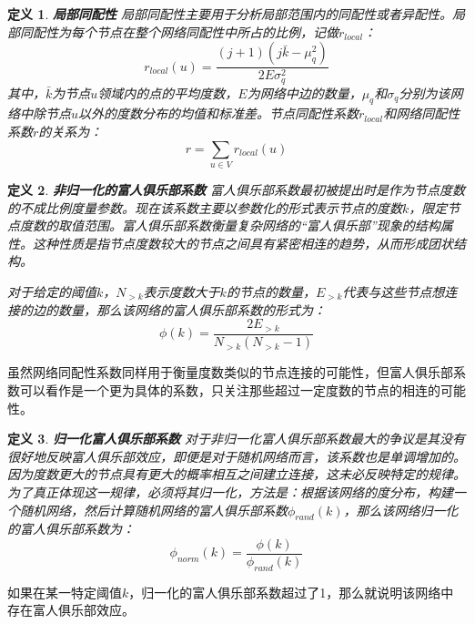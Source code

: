\documentclass{ctexart}
\newtheorem{Definition}{\hspace{2em}定义}[section]
\begin{document}
                \begin{Definition}
                    \textbf{局部同配性} 局部同配性主要用于分析局部范围内的同配性或者异配性。局部同配性为每个节点在整个网络同配性中所占的比例，记做$r_{local}$：
                    \begin{equation}
                        r_{local}(u) = \frac{(j + 1)(j\bar{k}-\mu_q^2)}{2 E \sigma_q^2}
                    \end{equation}
                    其中，$\bar{k}$为节点$u$领域内的点的平均度数，$E$为网络中边的数量，$\mu_q$和$\sigma_q$分别为该网络中除节点$u$以外的度数分布的均值和标准差。节点同配性系数$r_{local}$和网络同配性系数$r$的关系为：
                    \begin{equation}
                        r = \sum_{u\in V} r_{local}(u)
                    \end{equation}
                \end{Definition}
                \begin{Definition}
                    \textbf{非归一化的富人俱乐部系数} 富人俱乐部系数最初被提出时是作为节点度数的不成比例度量参数。现在该系数主要以参数化的形式表示节点的度数$k$，限定节点度数的取值范围。富人俱乐部系数衡量复杂网络的“富人俱乐部”现象的结构属性。这种性质是指节点度数较大的节点之间具有紧密相连的趋势，从而形成团状结构。

                    对于给定的阈值$k$，$N_{>k}$表示度数大于$k$的节点的数量，$E_{>k}$代表与这些节点想连接的边的数量，那么该网络的富人俱乐部系数的形式为：
                    \begin{equation}
                        \phi(k) = \frac{2E_{>k}}{N_{>k}(N_{>k}-1)}
                    \end{equation}
                \end{Definition}
                虽然网络同配性系数同样用于衡量度数类似的节点连接的可能性，但富人俱乐部系数可以看作是一个更为具体的系数，只关注那些超过一定度数的节点的相连的可能性。

                \begin{Definition}
                    \textbf{归一化富人俱乐部系数}  对于非归一化富人俱乐部系数最大的争议是其没有很好地反映富人俱乐部效应，即便是对于随机网络而言，该系数也是单调增加的。因为度数更大的节点具有更大的概率相互之间建立连接，这未必反映特定的规律。为了真正体现这一规律，必须将其归一化，方法是：根据该网络的度分布，构建一个随机网络，然后计算随机网络的富人俱乐部系数$\phi_{rand}(k)$，那么该网络归一化的富人俱乐部系数为：
                    \begin{equation}
                        \phi_{norm}(k) = \frac{\phi(k)}{\phi_{rand}(k)}
                    \end{equation}
                \end{Definition}
                如果在某一特定阈值$k$，归一化的富人俱乐部系数超过了1，那么就说明该网络中存在富人俱乐部效应。
\end{document}
